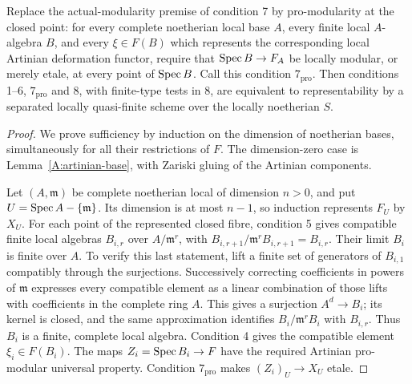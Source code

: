 \begin{theorem}
\label{A:pro7-representability}
Replace the actual-modularity premise of condition 7 by
pro-modularity at the closed point: for every complete noetherian
local base $A$, every finite local $A$-algebra $B$, and every
$\xi\in F(B)$ which represents the corresponding local Artinian
deformation functor, require that $\operatorname{Spec} B\to F_A$ be locally
modular, or merely etale, at every point of $\operatorname{Spec} B$.
Call this condition $7_{\mathrm{pro}}$.
Then conditions 1--6, $7_{\mathrm{pro}}$ and 8, with finite-type
tests in 8, are equivalent to representability by a separated
locally quasi-finite scheme over the locally noetherian $S$.
\end{theorem}
\begin{proof}
We prove sufficiency by induction on the dimension of noetherian
bases, simultaneously for all their restrictions of $F$.
The dimension-zero case is Lemma~\ref{A:artinian-base}, with
Zariski gluing of the Artinian components.

Let $(A,\mathfrak m)$ be complete noetherian local of dimension
$n>0$, and put $U=\operatorname{Spec} A-\{\mathfrak m\}$. Its dimension is at
most $n-1$, so induction represents $F_U$ by $X_U$.
For each point of the represented closed fibre, condition 5 gives
compatible finite local algebras $B_{i,r}$ over $A/\mathfrak m^r$,
with $B_{i,r+1}/\mathfrak m^rB_{i,r+1}=B_{i,r}$.
Their limit $B_i$ is finite over $A$. To verify this last statement,
lift a finite set of generators of $B_{i,1}$ compatibly through
the surjections. Successively correcting coefficients in powers
of $\mathfrak m$ expresses every compatible element as a linear
combination of those lifts with coefficients in the complete ring
$A$. This gives a surjection $A^d\to B_i$; its kernel is closed,
and the same approximation identifies $B_i/\mathfrak m^rB_i$
with $B_{i,r}$. Thus $B_i$ is a finite, complete local algebra.
Condition 4 gives the compatible element $\xi_i\in F(B_i)$.
The maps $Z_i=\operatorname{Spec} B_i\to F$ have the required Artinian
pro-modular universal property. Condition $7_{\mathrm{pro}}$
makes $(Z_i)_U\to X_U$ etale.


\end{proof}
